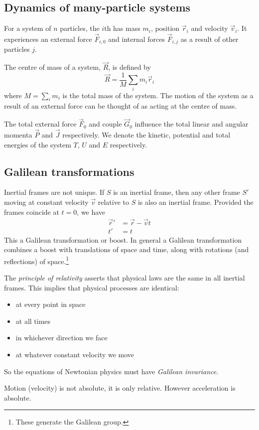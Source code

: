 \documentclass[a4paper]{article}
\begin{document}
\subsection{Dynamics of many-particle systems}
For a system of $n$ particles, the $i$th has mass $m_i$, position $\vec{r}_i$ and velocity $\vec{v}_i$. It experiences an external force $\vec{F}_{i,0}$ and internal forces $\vec{F}_{i,j}$ as a result of other particles $j$.

\begin{defi}
  The centre of mass of a system, $\vec{R}$, is defined by $$\vec{R} = \frac{1}{M}\sum_im_i\vec{r}_i$$ where $M=\sum_im_i$ is the total mass of the system. The motion of the system as a result of an external force can be thought of as acting at the centre of mass. 
\end{defi}

The total external force $\vec{F}_0$ and couple $\vec{G}_0$ influence the total linear and angular momenta $\vec{P}$ and $\vec{J}$ respectively. We denote the kinetic, potential and total energies of the system $T$, $U$ and $E$ respectively.

\subsection{Galilean transformations}
Inertial frames are not unique. If $S$ is an inertial frame, then any other frame $S'$ moving at constant velocity $\vec{v}$ relative to $S$ is also an inertial frame. Provided the frames coincide at $t=0$, we have
\begin{align*}
  \vec{r}' &= \vec{r} - \vec{v}t \\
  t' &= t
\end{align*}
This a Galilean transformation or boost. In general a Galilean transformation combines a boost with translations of space and time, along with rotations (and reflections) of space.\footnote{These generate the Galilean group.}


\begin{law}
  The \emph{principle of relativity} asserts that physical laws are the same in all inertial frames. This implies that physical processes are identical:
  \begin{itemize}
  \item at every point in space
  \item at all times
  \item in whichever direction we face
  \item at whatever constant velocity we move
  \end{itemize}

  So the equations of Newtonian physics must have \emph{Galilean invariance}.
\end{law}
Motion (velocity) is not absolute, it is only relative. However acceleration is absolute.
\end{document}

